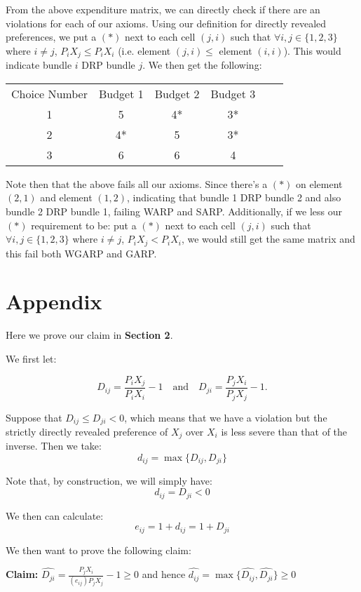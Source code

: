 \documentclass{article} %
\begin{document}
From the above expenditure matrix, we can directly check if there are an violations for each of our axioms. Using our definition for directly revealed preferences, we put a $(*)$ next to each cell $(j,i)$ such that $\forall i,j\in\{1,2,3\}$ where $i\not=j$, $P_iX_j\leq P_iX_i$ (i.e. element $(j,i)\leq$ element $(i,i)$). This would indicate bundle $i$ DRP bundle $j$. We then get the following:

\begin{center}
\begin{tabular}{ cccccc } 
Choice Number & Budget 1 & Budget 2 & Budget 3 \\
1&5&4*&3* \\
2&4*&5&3* \\
3&6&6&4
\end{tabular}
\end{center}

Note then that the above fails all our axioms. Since there's a $(*)$ on element $(2,1)$ and element $(1,2)$, indicating that bundle 1 DRP bundle 2 and also bundle 2 DRP bundle 1, failing WARP and SARP. Additionally, if we less our $(*)$ requirement to be: put a $(*)$ next to each cell $(j,i)$ such that $\forall i,j\in\{1,2,3\}$ where $i\not=j$, $P_iX_j<P_iX_i$, we would still get the same matrix and this fail both WGARP and GARP.

\section{Appendix}

Here we prove our claim in \textbf{Section 2}.


We first let:


$$D_{ij}=\frac{P_iX_j}{P_iX_i}-1 \quad \text{and} \quad D_{ji}=\frac{P_jX_i}{P_jX_j}-1.$$



Suppose that $D_{ij}\leq D_{ji}<0$, which means that we have a violation but the strictly directly revealed preference of $X_j$ over $X_i$ is less severe than that of the inverse. Then we take:
$$d_{ij}=\max\{D_{ij},D_{ji}\}$$

Note that, by construction, we will simply have:
$$d_{ij}=D_{ji}<0$$

We then can calculate:
$$e_{ij}=1+d_{ij}=1+D_{ji}$$

We then want to prove the following claim:


\textbf{Claim:} $\hat{D_{ji}}=\frac{P_jX_i}{(e_{ij})P_jX_j}-1\geq0$ and hence $\hat{d_{ij}}=\max\{\hat{D_{ij}},\hat{D_{ji}}\}\geq0$
\end{document}
